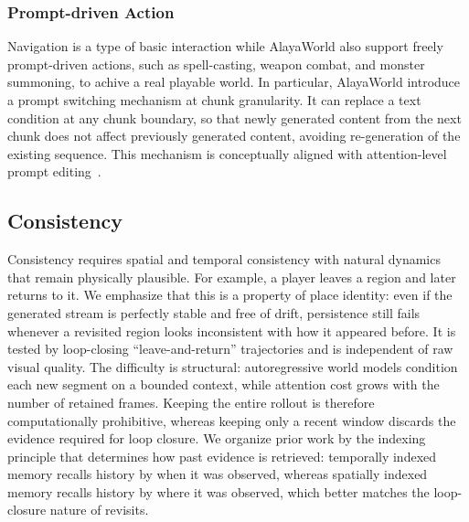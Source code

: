 \subsubsection{Prompt-driven Action} 
Navigation is a type of basic interaction while AlayaWorld also support freely prompt-driven actions, such as spell-casting, weapon combat, and monster summoning, to achive a real playable world. In particular, AlayaWorld introduce a prompt switching mechanism at chunk granularity. It can replace a text condition at any chunk boundary, so that newly generated content from the next chunk does not affect previously generated content, avoiding re-generation of the existing sequence. This mechanism is conceptually aligned with attention-level prompt editing~\cite{hertz2022prompt2prompt,liu2024videop2p}.

\subsection{Consistency}
\label{subsec:persistence}

Consistency requires spatial and temporal consistency with natural dynamics that remain physically plausible. For example, a player leaves a region and later returns to it.
We emphasize that this is a property of place identity: even if the generated stream is perfectly stable and free of drift, persistence still fails whenever a revisited region looks inconsistent with how it appeared before. It is tested by loop-closing ``leave-and-return'' trajectories and is independent of raw visual quality.
The difficulty is structural: autoregressive world models condition each new segment on a bounded context, while attention cost grows with the number of retained frames.
Keeping the entire rollout is therefore computationally prohibitive, whereas keeping only a recent window discards the evidence required for loop closure.
We organize prior work by the indexing principle that determines how past evidence is retrieved: temporally indexed memory recalls history by when it was observed, whereas spatially indexed memory recalls history by where it was observed, which better matches the loop-closure nature of revisits.

